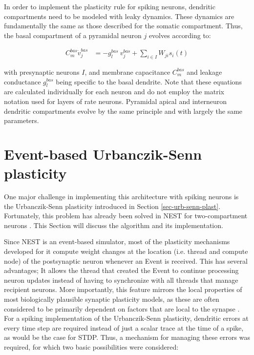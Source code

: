 In order to implement the plasticity rule for spiking neurons, dendritic compartments need to be modeled with leaky
dynamics. These dynamics are fundamentally the same as those described for the somatic compartment. Thus, the basal
compartment of a pyramidal neuron $j$ evolves according to:

\begin{align}
  C_m^{bas} \dot{v}_j^{bas} & = -g_l^{bas} \  v_j^{bas} + \sum_{i \in I} W_{ji} s_i(t)     \label{eq-spiking-basal-compartment}
\end{align}

with presynaptic neurons $I$, and membrane capacitance $C_m^{bas}$ and leakage conductance $g_l^{bas}$ being specific to
the basal dendrite. Note that these equations are calculated individually for each neuron and do not employ the matrix
notation used for layers of rate neurons. Pyramidal apical and interneuron dendritic compartments evolve by the same
principle and with largely the same parameters.

\section{Event-based Urbanczik-Senn plasticity}\label{sec-event-urb}

One major challenge in implementing this architecture with spiking neurons is the Urbanczik-Senn plasticity introduced
in Section \ref{sec-urb-senn-plast}.  Fortunately, this problem has already been solved in NEST for two-compartment
neurons \citep{Stapmanns2021}. This Section will discuss the algorithm and its implementation.
\newline

Since NEST is an event-based simulator, most of the plasticity mechanisms developed for it compute weight changes at the
location (i.e. thread and compute node) of the postsynaptic neuron whenever an Event is received. This has several
advantages; It allows the thread that created the Event to continue processing neuron updates instead of having to
synchronize with all threads that manage recipient neurons.  More importantly, this feature mirrors the local properties
of most biologically plausible synaptic plasticity models, as these are often considered to be primarily dependent on
factors that are local to the synapse \citep{magee2020synaptic}. For a spiking implementation of the Urbanczik-Senn
plasticity, dendritic errors at every time step are required instead of just a scalar trace at the time of a spike, as
would be the case for STDP. Thus, a mechanism for managing these errors was required, for which two basic possibilities
were considered:

